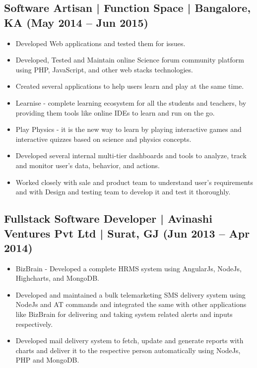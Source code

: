 \documentclass[10pt,a4paper]{article}
\begin{document}
\subsection*{Software Artisan | Function Space | Bangalore, KA (May 2014 -- Jun 2015)}
\begin{itemize}[leftmargin=*]
  \item Developed Web applications and tested them for issues.
  \item Developed, Tested and Maintain online Science forum community platform using PHP, JavaScript, and other web stacks technologies.
  \item Created several applications to help users learn and play at the same time.
  \item Learnise - complete learning ecosystem for all the students and teachers, by providing them tools like online IDEs to learn and run on the go.
  \item Play Physics - it is the new way to learn by playing interactive games and interactive quizzes based on science and physics concepts.
  \item Developed several internal multi-tier dashboards and tools to analyze, track and monitor user's data, behavior, and actions.
  \item Worked closely with sale and product team to understand user's requirements and with Design and testing team to develop it and test it thoroughly.
\end{itemize}

\subsection*{Fullstack Software Developer | Avinashi Ventures Pvt Ltd | Surat, GJ (Jun 2013 -- Apr 2014)}
\begin{itemize}[leftmargin=*]
  \item BizBrain - Developed a complete HRMS system using AngularJs, NodeJs, Highcharts, and MongoDB.
  \item Developed and maintained a bulk telemarketing SMS delivery system using NodeJs and AT commands and integrated the same with other applications like BizBrain for delivering and taking system related alerts and inputs respectively.
  \item Developed mail delivery system to fetch, update and generate reports with charts and deliver it to the respective person automatically using NodeJs, PHP and MongoDB.
\end{itemize}
\end{document}
